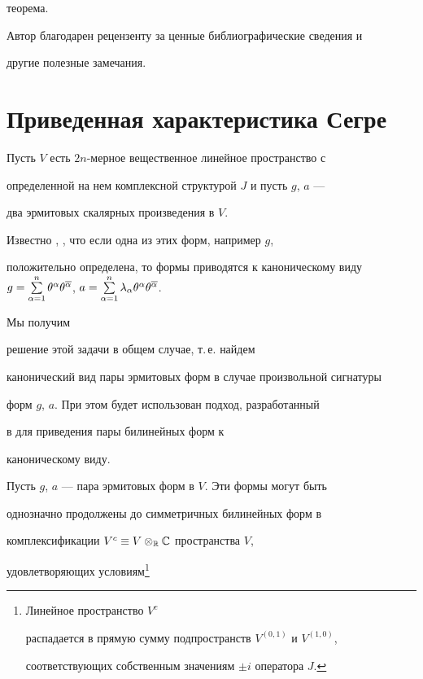теорема.





Автор благодарен рецензенту за ценные библиографические сведения и


другие полезные замечания.





\section{Приведенная характеристика Сегре}





Пусть $V$ есть $2n$-мерное вещественное линейное пространство с


определенной на нем комплексной структурой $J$ и пусть $g$, $a$ ---


два эрмитовых скалярных произведения в $V$.





Известно \cite{post}, \cite{shir2}, что если одна из этих форм, например $g$,


положительно определена, то формы приводятся к каноническому виду $g =


\sum\limits^n_{\alpha=1} \theta^\alpha \theta^{\ol\alpha}$, $a =


\sum\limits^n_{\alpha=1} \lambda_\alpha \theta^\alpha \theta^{\ol\alpha}$.





Мы получим


решение этой задачи в общем случае, т.\,е.{} найдем


канонический вид пары эрмитовых форм в случае произвольной сигнатуры


форм $g$, $a$. При этом будет использован подход, разработанный


в \cite{pet1} для приведения пары билинейных форм к


каноническому виду.





Пусть $g$, $a$ --- пара эрмитовых форм в $V$. Эти формы могут быть


однозначно продолжены до симметричных билинейных форм в


комплексификации $V^c \equiv V\otimes_{\Bbb R} \Bbb C$ пространства $V$,


удовлетворяющих условиям\footnote{Линейное пространство $V^c$


распадается в прямую сумму подпространств $V^{(0,1)}$ и $V^{(1,0)}$,


соответствующих собственным значениям $\pm i$ оператора $J$.}


